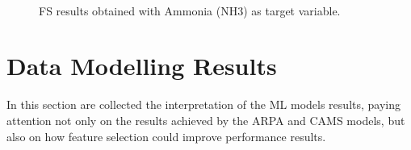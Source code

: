 \pagebreak
\clearpage
\begin{figure}[H]
\centering
{}\\
\caption{FS results obtained with Ammonia (NH3) as target variable.}
\label{fig:fs_nh3}
\end{figure}
\section{Data Modelling Results}
In this section are collected the interpretation of the ML models results, paying attention not only on the results achieved by the ARPA and CAMS models, but also on how feature selection could improve performance results. 
